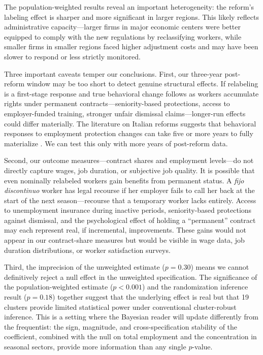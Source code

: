 \documentclass[12pt]{article}
\begin{document}
The population-weighted results reveal an important heterogeneity: the reform's labeling effect is sharper and more significant in larger regions. This likely reflects administrative capacity---larger firms in major economic centers were better equipped to comply with the new regulations by reclassifying workers, while smaller firms in smaller regions faced higher adjustment costs and may have been slower to respond or less strictly monitored.

Three important caveats temper our conclusions. First, our three-year post-reform window may be too short to detect genuine structural effects. If relabeling is a first-stage response and true behavioral change follows as workers accumulate rights under permanent contracts---seniority-based protections, access to employer-funded training, stronger unfair dismissal claims---longer-run effects could differ materially. The literature on Italian reforms suggests that behavioral responses to employment protection changes can take five or more years to fully materialize \citep{kugler2007employment}. We can test this only with more years of post-reform data.

Second, our outcome measures---contract shares and employment levels---do not directly capture wages, job duration, or subjective job quality. It is possible that even nominally relabeled workers gain benefits from permanent status. A \emph{fijo discontinuo} worker has legal recourse if her employer fails to call her back at the start of the next season---recourse that a temporary worker lacks entirely. Access to unemployment insurance during inactive periods, seniority-based protections against dismissal, and the psychological effect of holding a ``permanent'' contract may each represent real, if incremental, improvements. These gains would not appear in our contract-share measures but would be visible in wage data, job duration distributions, or worker satisfaction surveys.

Third, the imprecision of the unweighted estimate ($p = 0.30$) means we cannot definitively reject a null effect in the unweighted specification. The significance of the population-weighted estimate ($p < 0.001$) and the randomization inference result ($p = 0.18$) together suggest that the underlying effect is real but that 19 clusters provide limited statistical power under conventional cluster-robust inference. This is a setting where the Bayesian reader will update differently from the frequentist: the sign, magnitude, and cross-specification stability of the coefficient, combined with the null on total employment and the concentration in seasonal sectors, provide more information than any single $p$-value.
\end{document}
